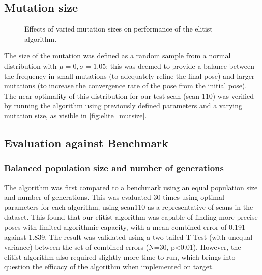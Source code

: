 \documentclass[authoryearcitations]{UoYCSproject}
\begin{document}

\subsection{Mutation size}

\datatableelitemutsize

\begin{figure}
	\centering
	\caption[Optimising mutation step size for the elitist selection algorithm.]{Effects of varied mutation sizes on performance of the elitist algorithm.}
	\label{fig:elite_mutsize}
\end{figure}

The size of the mutation was defined as a random sample from a normal distribution with $\mu=0, \sigma=1.05$; this was deemed to provide a balance between the frequency in small mutations (to adequately refine the final pose) and larger mutations (to increase the convergence rate of the pose from the initial pose). The near-optimality of this distribution for our test scan (scan 110) was verified by running the algorithm using previously defined parameters and a varying mutation size, as visible in \autoref{fig:elite_mutsize}.




\subsection{Evaluation against Benchmark}
\subsubsection{Balanced population size and number of generations}
\label{subsec:ga_vs_elite_eq_pop_gen}
The algorithm was first compared to a benchmark using an equal population size and number of generations. This was evaluated 30 times using optimal parameters for each algorithm, using scan110 as a representative of scans in the dataset. This found that our elitist algorithm was capable of finding more precise poses with limited algorithmic capacity, with a mean combined error of 0.191 against 1.839. The result was validated using a two-tailed T-Test (with unequal variance) between the set of combined errors (N=30, p<0.01). However, the elitist algorithm also required slightly more time to run, which brings into question the efficacy of the algorithm when implemented on target.
\end{document}
